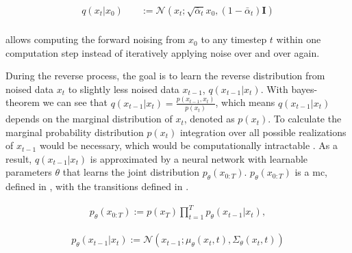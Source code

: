 \begin{equation}
  \label{eqn:forwards_2}
  \begin{align*}
    q(x_t | x_0) \quad & := \mathcal{N}(x_t; \sqrt{\bar{\alpha}_t} x_0, (1 - \bar{\alpha}_t) \textbf{I})\\
  \end{align*}
\end{equation}

 \cite{ho2020DenoisingDiffusionProbabilistic} allows computing the forward noising from $x_0$ to any timestep $t$ within one computation step instead of iteratively applying noise over and over again.
\newline

During the reverse process, the goal is to learn the reverse distribution from noised data $x_t$ to slightly less noised data $x_{t-1}$, $q(x_{t-1}|x_t)$.
With bayes-theorem we can see that $q(x_{t-1}|x_t) = \frac{p(x_{t-1},x_t)}{p(x_t)}$, which means $q(x_{t-1}|x_t)$ depends on the marginal distribution of $x_t$, denoted as $p(x_t)$.
To calculate the marginal probability distribution $p(x_t)$ integration over all possible realizations of $x_{t-1}$ would be necessary, which would be computationally intractable \cite{capel2022MasterThesisDenoising}.
As a result, $q(x_{t-1}|x_t)$ is approximated by a neural network with learnable parameters $\theta$ that learns the joint distribution $p_{\theta}(x_{0:T})$.
$p_{\theta}(x_{0:T})$ is a \gls{mc}, defined in , with the transitions defined in  \cite{capel2022MasterThesisDenoising, ho2020DenoisingDiffusionProbabilistic}.

\begin{equation}
  \label{eqn:reverse_1}
  \begin{align*}
    p_{\theta}(x_{0:T}) := p(x_T) \prod_{t=1}^T p_{\theta}(x_{t-1} | x_t),
  \end{align*}
\end{equation}

\begin{equation}
  \label{eqn:reverse_2}
  \begin{align*}
    p_{\theta}(x_{t-1}|x_t) := \mathcal{N}(x_{t-1}; \mu_{\theta}(x_t, t), \Sigma_{\theta}(x_t, t))
  \end{align*}
\end{equation}
    

